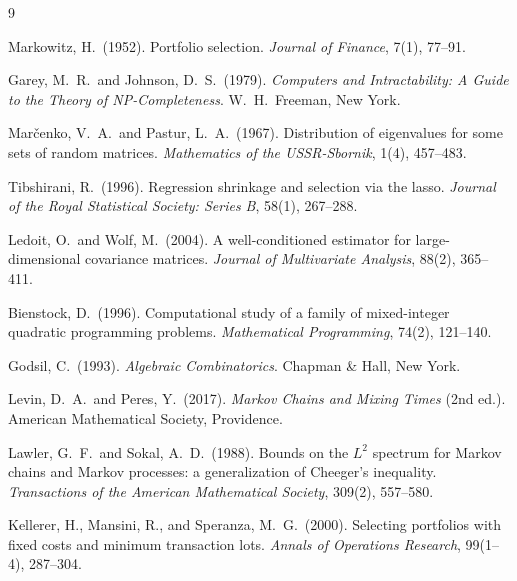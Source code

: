 \documentclass[11pt]{article}
\begin{document}
\begin{thebibliography}{9}

Markowitz, H.\ (1952).
Portfolio selection.
\textit{Journal of Finance}, 7(1), 77--91.

Garey, M.~R.\ and Johnson, D.~S.\ (1979).
\textit{Computers and Intractability: A Guide to the Theory of
NP-Completeness}.
W.~H.\ Freeman, New York.

Mar\v{c}enko, V.~A.\ and Pastur, L.~A.\ (1967).
Distribution of eigenvalues for some sets of random matrices.
\textit{Mathematics of the USSR-Sbornik}, 1(4), 457--483.

Tibshirani, R.\ (1996).
Regression shrinkage and selection via the lasso.
\textit{Journal of the Royal Statistical Society: Series B}, 58(1), 267--288.

Ledoit, O.\ and Wolf, M.\ (2004).
A well-conditioned estimator for large-dimensional covariance matrices.
\textit{Journal of Multivariate Analysis}, 88(2), 365--411.

Bienstock, D.\ (1996).
Computational study of a family of mixed-integer quadratic programming
problems.
\textit{Mathematical Programming}, 74(2), 121--140.

Godsil, C.\ (1993).
\textit{Algebraic Combinatorics}.
Chapman \& Hall, New York.

Levin, D.~A.\ and Peres, Y.\ (2017).
\textit{Markov Chains and Mixing Times} (2nd ed.).
American Mathematical Society, Providence.

Lawler, G.~F.\ and Sokal, A.~D.\ (1988).
Bounds on the $L^2$ spectrum for Markov chains and Markov processes:
a generalization of Cheeger's inequality.
\textit{Transactions of the American Mathematical Society},
309(2), 557--580.

Kellerer, H., Mansini, R., and Speranza, M.~G.\ (2000).
Selecting portfolios with fixed costs and minimum transaction lots.
\textit{Annals of Operations Research}, 99(1--4), 287--304.

\end{thebibliography}
\end{document}
